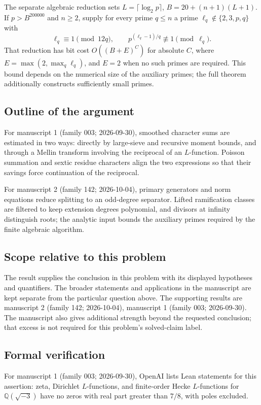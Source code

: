 \documentclass[11pt]{article}
\begin{document}
The separate algebraic reduction sets $L=\lceil\log_2p\rceil$, $B=20+(n+1)(L+1)$. If $p>B^{200000}$ and $n\ge2$, supply for every prime $q\le n$ a prime $\ell_q\notin\{2,3,p,q\}$ with
\[
 \ell_q\equiv1\pmod{12q},\qquad p^{(\ell_q-1)/q}\not\equiv1\pmod{\ell_q}.
\]
That reduction has bit cost $O((B+E)^C)$ for absolute $C$, where $E=\max(2,\max_q\ell_q)$, and $E=2$ when no such primes are required. This bound depends on the numerical size of the auxiliary primes; the full theorem additionally constructs sufficiently small primes.

\subsection{Outline of the argument}
For manuscript 1 (family 003; 2026-09-30), smoothed character sums are estimated in two ways: directly by large-sieve and recursive moment bounds, and through a Mellin transform involving the reciprocal of an $L$-function. Poisson summation and sextic residue characters align the two expressions so that their savings force continuation of the reciprocal.

For manuscript 2 (family 142; 2026-10-04), primary generators and norm equations reduce splitting to an odd-degree separator. Lifted ramification classes are filtered to keep extension degrees polynomial, and divisors at infinity distinguish roots; the analytic input bounds the auxiliary primes required by the finite algebraic algorithm.

\subsection{Scope relative to this problem}
The result supplies the conclusion in this problem with its displayed hypotheses and quantifiers. The broader statements and applications in the manuscript are kept separate from the particular question above. The supporting results are manuscript 2 (family 142; 2026-10-04), manuscript 1 (family 003; 2026-09-30). The manuscript also gives additional strength beyond the requested conclusion; that excess is not required for this problem's solved-claim label.

\subsection{Formal verification}
For manuscript 1 (family 003; 2026-09-30), OpenAI lists Lean statements for this assertion: zeta, Dirichlet $L$-functions, and finite-order Hecke $L$-functions for $\mathbb Q(\sqrt{-3})$ have no zeros with real part greater than $7/8$, with poles excluded.
\end{document}
